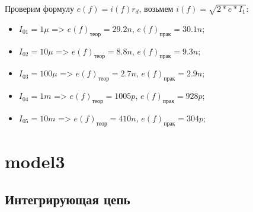 \documentclass[a4paper, 12pt]{article}%
\begin{document}
\begin{enumerate}
Проверим формулу $e(f) = i(f)r_d$, возьмем $i(f) = \sqrt{2*e*I_1}$:
\begin{itemize}
    \item $I_{01} = 1\mu$ => $e(f)_\text{теор} = 29.2n$, $e(f)_\text{прак} = 30.1n$;
    \item $I_{02} = 10\mu$ => $e(f)_\text{теор} = 8.8n$, $e(f)_\text{прак} = 9.3n$;
    \item $I_{03} = 100\mu$ => $e(f)_\text{теор} = 2.7n$, $e(f)_\text{прак} = 2.9n$;
    \item $I_{04} = 1m$ => $e(f)_\text{теор} = 1005p$, $e(f)_\text{прак} = 928p$;
    \item $I_{05} = 10m$ => $e(f)_\text{теор} = 410n$, $e(f)_\text{прак} = 304p$;
\end{itemize}

\end{enumerate}

\section{\textbf{model3}}

\subsection*{Интегрирующая цепь}
\end{document}
